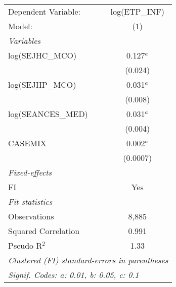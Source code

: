 
\begingroup
\centering
\begin{tabular}{lc}
   \tabularnewline \midrule \midrule
   Dependent Variable: & log(ETP\_INF)\\   
   Model:              & (1)\\  
   \midrule
   \emph{Variables}\\
   log(SEJHC\_MCO)     & 0.127$^{a}$\\   
                       & (0.024)\\   
   log(SEJHP\_MCO)     & 0.031$^{a}$\\   
                       & (0.008)\\   
   log(SEANCES\_MED)   & 0.031$^{a}$\\   
                       & (0.004)\\   
   CASEMIX             & 0.002$^{a}$\\   
                       & (0.0007)\\   
   \midrule
   \emph{Fixed-effects}\\
   FI                  & Yes\\  
   \midrule
   \emph{Fit statistics}\\
   Observations        & 8,885\\  
   Squared Correlation & 0.991\\  
   Pseudo R$^2$        & 1.33\\  
   \midrule \midrule
   \multicolumn{2}{l}{\emph{Clustered (FI) standard-errors in parentheses}}\\
   \multicolumn{2}{l}{\emph{Signif. Codes: a: 0.01, b: 0.05, c: 0.1}}\\
\end{tabular}
\par\endgroup


